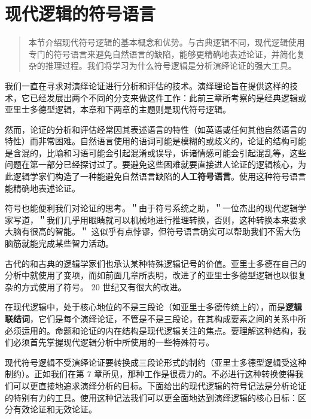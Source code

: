 \section{现代逻辑的符号语言}

\begin{quotation}
本节介绍现代符号逻辑的基本概念和优势。与古典逻辑不同，现代逻辑使用专门的符号语言来避免自然语言的缺陷，能够更精确地表述论证，并简化复杂的推理过程。我们将学习为什么符号逻辑是分析演绎论证的强大工具。
\end{quotation}

我们一直在寻求对演绎论证进行分析和评估的技术。演绎理论旨在提供这样的技术，它已经发展出两个不同的分支来做这件工作：此前三章所考察的是经典逻辑或亚里士多德型逻辑，本章和下两章的主题则是现代符号逻辑。

然而，论证的分析和评估经常因其表述语言的特性（如英语或任何其他自然语言的特性）而非常困难。自然语言使用的语词可能是模糊的或歧义的，论证的结构可能是含混的，比喻和习语可能会引起混淆或误导，诉诸情感可能会引起混乱等，这些问题在第一部分已经探讨过了。要避免这些困难就要直接进人论证的逻辑核心，为此逻辑学家们构造了一种能避免自然语言缺陷的\textbf{人工符号语言}。使用这种符号语言能精确地表述论证。

符号也能便利我们对论证的思考。＂由于符号系统之助，＂一位杰出的现代逻辑学家写道，＂我们几乎用眼睛就可以机械地进行推理转换，否则，这种转换本来要求大脑有很高的智能。＂\cite{quine1940} 这似乎有点悖谬，但符号语言确实可以帮助我们不需大伤脑筋就能完成某些智力活动。

古代的和古典的逻辑学家们也承认某种特殊逻辑记号的价值。亚里士多德在自己的分析中就使用了变项，而如前面几章所表明，改进了的亚里士多德型逻辑也以很复杂的方式使用了符号。\cite{aristotle-logic} 20 世纪又有很大的改进。

在现代逻辑中，处于核心地位的不是三段论（如亚里士多德传统上的），而是\textbf{逻辑联结词}，它们是每个演绎论证，不管是不是三段论，在其构成要素之间的关系中所必须运用的。命题和论证的内在结构是现代逻辑关注的焦点。要理解这种结构，我们必须首先掌握现代逻辑分析中所使用的一些特殊符号。

现代符号逻辑不受演绎论证要转换成三段论形式的制约（亚里士多德型逻辑受这种制约）。正如我们在第 7 章所见，那种工作是很费力的。不必进行这种转换使得我们可以更直接地追求演绎分析的目标。下面给出的现代逻辑的符号记法是分析论证的特别有力的工具。使用这种记法我们可以更全面地达到演绎逻辑的核心目标：区分有效论证和无效论证。

